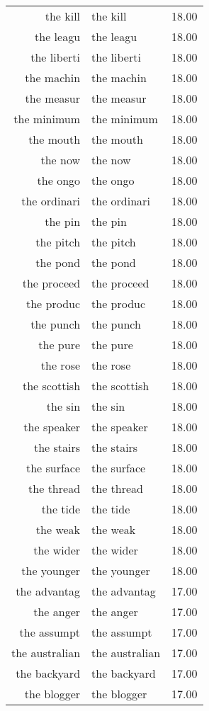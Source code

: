 \begin{table}[ht]
\begin{tabular}{rlr}
  the kill & the kill & 18.00 \\ 
  the leagu & the leagu & 18.00 \\ 
  the liberti & the liberti & 18.00 \\ 
  the machin & the machin & 18.00 \\ 
  the measur & the measur & 18.00 \\ 
  the minimum & the minimum & 18.00 \\ 
  the mouth & the mouth & 18.00 \\ 
  the now & the now & 18.00 \\ 
  the ongo & the ongo & 18.00 \\ 
  the ordinari & the ordinari & 18.00 \\ 
  the pin & the pin & 18.00 \\ 
  the pitch & the pitch & 18.00 \\ 
  the pond & the pond & 18.00 \\ 
  the proceed & the proceed & 18.00 \\ 
  the produc & the produc & 18.00 \\ 
  the punch & the punch & 18.00 \\ 
  the pure & the pure & 18.00 \\ 
  the rose & the rose & 18.00 \\ 
  the scottish & the scottish & 18.00 \\ 
  the sin & the sin & 18.00 \\ 
  the speaker & the speaker & 18.00 \\ 
  the stairs & the stairs & 18.00 \\ 
  the surface & the surface & 18.00 \\ 
  the thread & the thread & 18.00 \\ 
  the tide & the tide & 18.00 \\ 
  the weak & the weak & 18.00 \\ 
  the wider & the wider & 18.00 \\ 
  the younger & the younger & 18.00 \\ 
  the advantag & the advantag & 17.00 \\ 
  the anger & the anger & 17.00 \\ 
  the assumpt & the assumpt & 17.00 \\ 
  the australian & the australian & 17.00 \\ 
  the backyard & the backyard & 17.00 \\ 
  the blogger & the blogger & 17.00 \\ 

\end{tabular}
\end{table}
